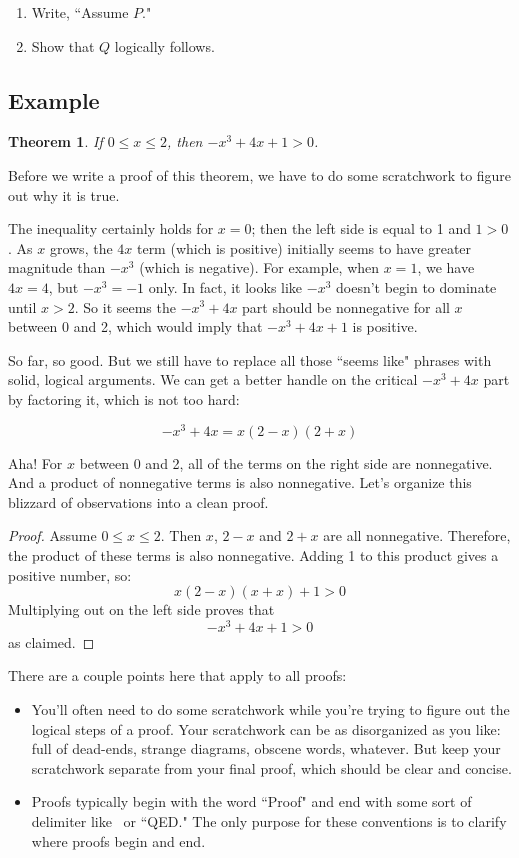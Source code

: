 \documentclass[11pt,oneside]{book}
\newtheorem{thm}{Theorem}[section]
\theoremstyle{definition}
\begin{document}
\begin{enumerate}
    \item Write, ``Assume $P$."

    \item Show that $Q$ logically follows.
\end{enumerate}

\subsection*{Example}
\begin{thm}
    If $0 \leq x \leq 2$, then $-x^{3} + 4x + 1 > 0$.
\end{thm}

Before we write a proof of this theorem, we have to do some scratchwork to figure out why it is true.

The inequality certainly holds for $x = 0$; then the left side is equal to 1 and $1 > 0$.
As $x$ grows, the $4x$ term (which is positive) initially seems to have greater magnitude than $-x^{3}$ (which is negative).
For example, when $x = 1$, we have $4x = 4$, but $-x^{3} = -1$ only.
In fact, it looks like $-x^{3}$ doesn't begin to dominate until $x > 2$.
So it seems the $-x^{3} + 4x$ part should be nonnegative for all $x$ between 0 and 2, which would imply that $-x^{3} + 4x + 1$ is positive.

So far, so good. But we still have to replace all those ``seems like" phrases with solid, logical arguments.
We can get a better handle on the critical $-x^{3} + 4x$ part by factoring it, which is not too hard:

\[ -x^{3} + 4x = x(2 - x)(2 + x) \]

Aha!
For $x$ between 0 and 2, all of the terms on the right side are nonnegative.
And a product of nonnegative terms is also nonnegative.
Let's organize this blizzard of observations into a clean proof.

\begin{proof}
    Assume $0 \leq x \leq 2$.
    Then $x$, $2 - x$ and $2 + x$ are all nonnegative.
    Therefore, the product of these terms is also nonnegative.
    Adding 1 to this product gives a positive number, so:
    \[ x(2 - x)(x + x) + 1 > 0 \]
    Multiplying out on the left side proves that
    \[ -x^{3} + 4x + 1 > 0 \]
    as claimed.
\end{proof}

There are a couple points here that apply to all proofs:
\begin{itemize}
    \item You'll often need to do some scratchwork while you're trying to figure out the logical steps of a proof.
    Your scratchwork can be as disorganized as you like: full of dead-ends, strange diagrams, obscene words, whatever. But keep your scratchwork separate from your final proof, which should be clear and concise.

    \item Proofs typically begin with the word ``Proof" and end with some sort of delimiter like \qedsymbol\ or ``QED."
    The only purpose for these conventions is to clarify where proofs begin and end.
\end{itemize}
\end{document}
